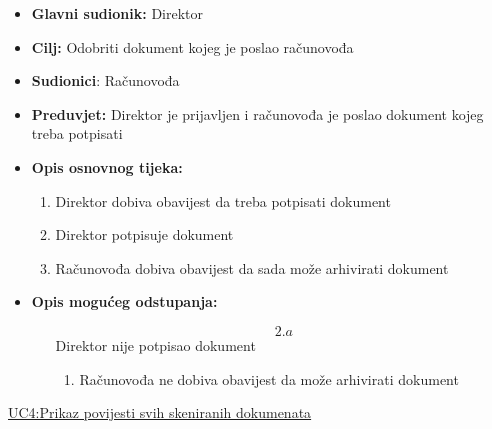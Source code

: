 \documentclass{article} %
\begin{document}
\begin{itemize}
	\item \textbf{Glavni sudionik:} Direktor
	
	
	\item \textbf{Cilj:} Odobriti dokument kojeg je poslao računovođa
	
	
	\item \textbf{Sudionici}: Računovođa
	
	
	\item \textbf{Preduvjet:} Direktor je prijavljen i računovođa je poslao dokument kojeg treba potpisati
	
	
	\item \textbf{Opis osnovnog tijeka:} 
	\begin{enumerate}
		\item Direktor dobiva obavijest da treba potpisati dokument
		
		
		\item Direktor potpisuje dokument
		
		
		\item Računovođa dobiva obavijest da sada može arhivirati dokument
		
	\end{enumerate}
	\item \textbf{Opis mogućeg odstupanja:}
	
	\begin{enumerate}
		\item[$$2.a$$] Direktor nije potpisao dokument
		
		\begin{enumerate}[label=\arabic*.]
			\item Računovođa ne dobiva obavijest da može arhivirati dokument
			
		\end{enumerate}
	\end{enumerate}
\end{itemize}
  

\noindent\underline{UC4:Prikaz povijesti svih skeniranih dokumenata}
\end{document}
